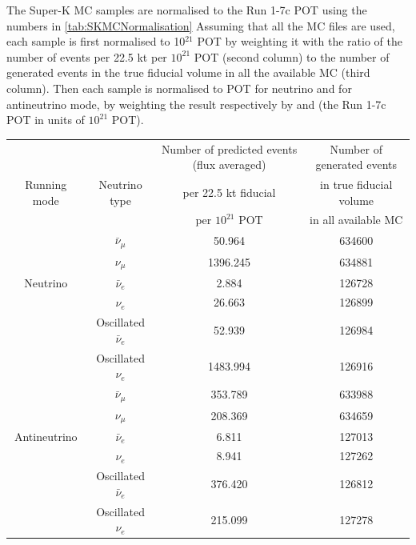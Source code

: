 The Super-K MC samples are normalised to the Run 1-7c POT 
using the numbers in \cref{tab:SKMCNormalisation}
Assuming that all the MC files are used, each sample is first normalised to 10$^{21}$ POT by weighting it 
with the ratio of the number of events per 22.5 kt per $10^{21}$ POT (second column) to the number of generated 
events in the true fiducial volume in all the available MC (third column). 
Then each sample is normalised to  
\TotalPotNuRunOneSevenC{} POT for neutrino and \TotalPotNuBarRunOneSevenC{} for antineutrino mode,
by weighting the result respectively by 
\TotalPotPerTwentyOneNu{}
and 
\TotalPotPerTwentyOneNuBar{}
(the Run 1-7c POT in units of $10^{21}$ POT). 
\begin{table}
\centering
\begin{tabular}{| c | c | c | c |}
\hline
 		&                             &  Number of predicted events (flux averaged)    & Number of generated events \\
Running mode    & Neutrino type               & per 22.5 kt fiducial 			       & in true fiducial volume    \\
                &		              & per $10^{21}$ POT     			       & in all available MC        \\  
\hline             
	 	&$\bar{\nu}_{\mu}$             &     50.964           &       634600               \\
		&$\nu_{\mu}$                   &     1396.245         &       634881               \\
Neutrino	&$\bar{\nu}_{e}$               &      2.884           &       126728               \\
		&$\nu_{e}$                     &      26.663          &       126899               \\
		&Oscillated $\bar{\nu}_{e}$    &     52.939           &       126984               \\
		&Oscillated $\nu_{e}$          &     1483.994         &       126916               \\
\hline
		&$\bar{\nu}_{\mu}$             &     353.789          &       633988               \\
		&$\nu_{\mu}$                   &     208.369          &       634659               \\
Antineutrino	&$\bar{\nu}_{e}$               &      6.811           &       127013               \\
		&$\nu_{e}$                     &      8.941           &       127262               \\
		&Oscillated $\bar{\nu}_{e}$    &     376.420          &       126812               \\
		&Oscillated $\nu_{e}$          &     215.099          &       127278               \\
	

\end{tabular}
\end{table}
